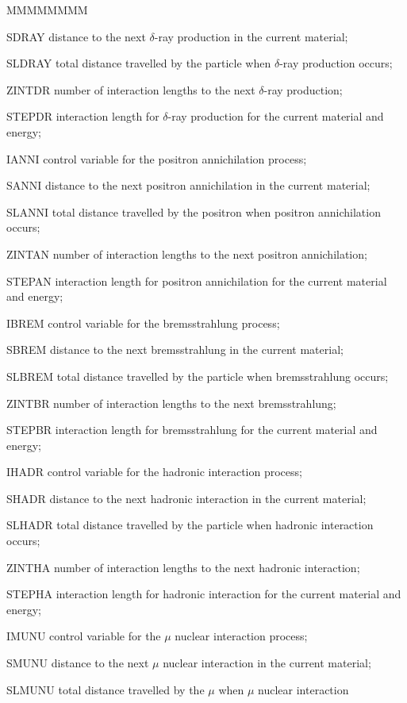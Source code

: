 \begin{DLtt}{MMMMMMMM}
\item[SDRAY] distance to the next $\delta$-ray production in the current material;
\item[SLDRAY] total distance travelled by the particle when $\delta$-ray production 
occurs;
\item[ZINTDR] number of interaction lengths to the next $\delta$-ray production;
\item[STEPDR] interaction length for $\delta$-ray production for the current 
material and energy;
\item[IANNI] control variable for the positron annichilation process;
\item[SANNI] distance to the next positron annichilation in the current material;
\item[SLANNI] total distance travelled by the positron when positron annichilation 
occurs;
\item[ZINTAN] number of interaction lengths to the next positron annichilation;
\item[STEPAN] interaction length for positron annichilation for the current 
material and energy;
\item[IBREM] control variable for the bremsstrahlung process;
\item[SBREM] distance to the next bremsstrahlung in the current material;
\item[SLBREM] total distance travelled by the particle when bremsstrahlung occurs;
\item[ZINTBR] number of interaction lengths to the next bremsstrahlung;
\item[STEPBR] interaction length for bremsstrahlung for the current material
and energy;
\item[IHADR] control variable for the hadronic interaction process;
\item[SHADR] distance to the next hadronic interaction in the current material;
\item[SLHADR] total distance travelled by the particle when hadronic interaction occurs;
\item[ZINTHA] number of interaction lengths to the next hadronic interaction;
\item[STEPHA] interaction length for hadronic interaction for the current material
and energy;
\item[IMUNU] control variable for the $\mu$ nuclear interaction process;
\item[SMUNU] distance to the next $\mu$ nuclear interaction in the current 
material;
\item[SLMUNU] total distance travelled by the $\mu$ when $\mu$ nuclear interaction 

\end{DLtt}
